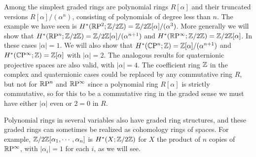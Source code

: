 \begin{example}
Among the simplest graded rings are polynomial rings $R[\alpha]$ and their truncated versions $R[\alpha]/(\alpha^n)$, consisting of polynomials of degree less than $n$. The example we have seen is $H^*(\mathbb{R}\mathrm{P}^2;\mathbb{Z}/2\mathbb{Z})=\mathbb{Z}/2\mathbb{Z}[\alpha]/(\alpha^3)$. More generally we will show that $H^*(\mathbb{R}\mathrm{P}^n;\mathbb{Z}/2\mathbb{Z})=\mathbb{Z}/2\mathbb{Z}[\alpha]/(\alpha^{n+1})$ and $H^*(\mathbb{R}\mathrm{P}^\infty;\mathbb{Z}/2\mathbb{Z})=\mathbb{Z}/2\mathbb{Z}[\alpha]$. In these cases $|\alpha|=1$. We will also show that $H^*(\mathbb{C}\mathrm{P}^n;\mathbb{Z})=\mathbb{Z}[\alpha]/(\alpha^{n+1})$ and $H^*(\mathbb{C}\mathrm{P}^\infty;\mathbb{Z})=\mathbb{Z}[\alpha]$ with $|\alpha|=2$. The analogous results for quaternionic projective spaces are also valid, with $|\alpha|=4$. The coefficient ring $\mathbb{Z}$ in the complex and quaternionic cases could be replaced by any commutative ring $R$, but not for $\mathbb{R}\mathrm{P}^n$ and $\mathbb{R}\mathrm{P}^\infty$ since a polynomial ring $R[\alpha]$ is strictly commutative, so for this to be a commutative ring in the graded sense we must have either $|\alpha|$ even or $2=0$ in $R$.\par
Polynomial rings in several variables also have graded ring structures, and these graded rings can sometimes be realized as cohomology rings of spaces. For example, $\mathbb{Z}/2\mathbb{Z}[\alpha_1,\cdots,\alpha_n]$ is $H^*(X;\mathbb{Z}/2\mathbb{Z})$ for $X$ the product of $n$ copies of $\mathbb{R}\mathrm{P}^\infty$, with $|\alpha_i|=1$ for each $i$, as we will see.
\end{example}
